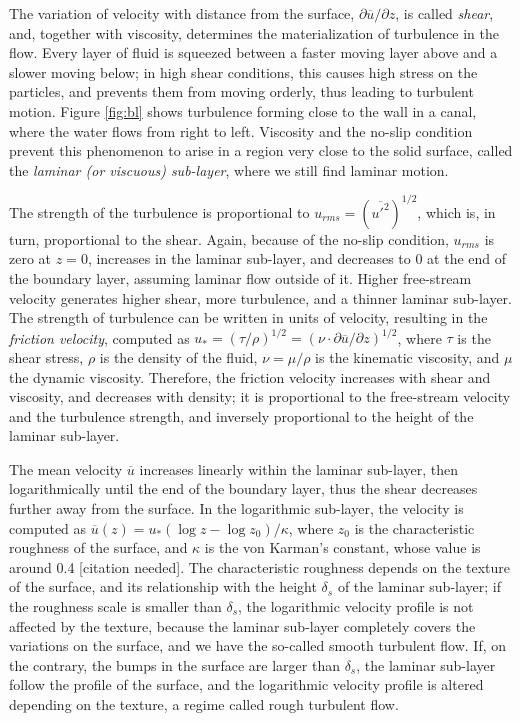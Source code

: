 \documentclass[a4paper]{book}
\begin{document}
The variation of velocity with distance from the surface, $\partial\overline{u}/\partial z$, is called \emph{shear}, and, together with viscosity, determines the materialization of turbulence in the flow. Every layer of fluid is squeezed between a faster moving layer above and a slower moving below; in high shear conditions, this causes high stress on the particles, and prevents them from moving orderly, thus leading to turbulent motion. Figure \ref{fig:bl} shows turbulence forming close to the wall in a canal, where the water flows from right to left. Viscosity and the no-slip condition prevent this phenomenon to arise in a region very close to the solid surface, called the \emph{laminar (or viscuous) sub-layer}, where we still find laminar motion.

The strength of the turbulence is proportional to $u_{rms}=(\overline{u'^2})^{1/2}$, which is, in turn, proportional to the shear. Again, because of the no-slip condition, $u_{rms}$ is zero at $z=0$, increases in the laminar sub-layer, and decreases to 0 at the end of the boundary layer, assuming laminar flow outside of it. Higher free-stream velocity generates higher shear, more turbulence, and a thinner laminar sub-layer. The strength of turbulence can be written in units of velocity, resulting in the \emph{friction velocity}, computed as $u_*=(\tau/\rho)^{1/2}=(\nu\cdot\partial\overline{u}/\partial z)^{1/2}$, where $\tau$ is the shear stress, $\rho$ is the density of the fluid, $\nu=\mu/\rho$ is the kinematic viscosity, and $\mu$ the dynamic viscosity. Therefore, the friction velocity increases with shear and viscosity, and decreases with density; it is proportional to the free-stream velocity and the turbulence strength, and inversely proportional to the height of the laminar sub-layer.

The mean velocity $\overline{u}$ increases linearly within the laminar sub-layer, then logarithmically until the end of the boundary layer, thus the shear decreases further away from the surface. In the logarithmic sub-layer, the velocity is computed as $\overline{u}(z)=u_*(\log z - \log z_0)/\kappa$, where $z_0$ is the characteristic roughness of the surface, and $\kappa$ is the von Karman's constant, whose value is around 0.4 [citation needed]. The characteristic roughness depends on the texture of the surface, and its relationship with the height $\delta_s$ of the laminar sub-layer; if the roughness scale is smaller than $\delta_s$, the logarithmic velocity profile is not affected by the texture, because the laminar sub-layer completely covers the variations on the surface, and we have the so-called smooth turbulent flow. If, on the contrary, the bumps in the surface are larger than $\delta_s$, the laminar sub-layer follow the profile of the surface, and the logarithmic velocity profile is altered depending on the texture, a regime called rough turbulent flow.
\end{document}
